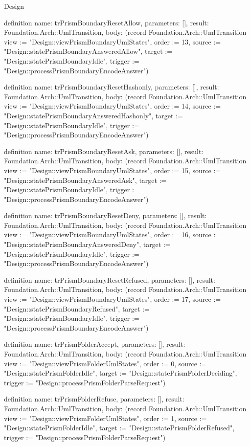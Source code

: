 \begin{lexlean}{Design}
\begin{semanticmodule}
definition{
  name: trPrismBoundaryResetAllow,
  parameters: [],
  result: Foundation.Arch::UmlTransition,
  body: (record Foundation.Arch::UmlTransition {view := "Design::viewPrismBoundaryUmlStates", order := 13, source := "Design::statePrismBoundaryAnsweredAllow", target := "Design::statePrismBoundaryIdle", trigger := "Design::processPrismBoundaryEncodeAnswer"})
}

definition{
  name: trPrismBoundaryResetHashonly,
  parameters: [],
  result: Foundation.Arch::UmlTransition,
  body: (record Foundation.Arch::UmlTransition {view := "Design::viewPrismBoundaryUmlStates", order := 14, source := "Design::statePrismBoundaryAnsweredHashonly", target := "Design::statePrismBoundaryIdle", trigger := "Design::processPrismBoundaryEncodeAnswer"})
}

definition{
  name: trPrismBoundaryResetAsk,
  parameters: [],
  result: Foundation.Arch::UmlTransition,
  body: (record Foundation.Arch::UmlTransition {view := "Design::viewPrismBoundaryUmlStates", order := 15, source := "Design::statePrismBoundaryAnsweredAsk", target := "Design::statePrismBoundaryIdle", trigger := "Design::processPrismBoundaryEncodeAnswer"})
}

definition{
  name: trPrismBoundaryResetDeny,
  parameters: [],
  result: Foundation.Arch::UmlTransition,
  body: (record Foundation.Arch::UmlTransition {view := "Design::viewPrismBoundaryUmlStates", order := 16, source := "Design::statePrismBoundaryAnsweredDeny", target := "Design::statePrismBoundaryIdle", trigger := "Design::processPrismBoundaryEncodeAnswer"})
}

definition{
  name: trPrismBoundaryResetRefused,
  parameters: [],
  result: Foundation.Arch::UmlTransition,
  body: (record Foundation.Arch::UmlTransition {view := "Design::viewPrismBoundaryUmlStates", order := 17, source := "Design::statePrismBoundaryRefused", target := "Design::statePrismBoundaryIdle", trigger := "Design::processPrismBoundaryEncodeAnswer"})
}

definition{
  name: trPrismFolderAccept,
  parameters: [],
  result: Foundation.Arch::UmlTransition,
  body: (record Foundation.Arch::UmlTransition {view := "Design::viewPrismFolderUmlStates", order := 0, source := "Design::statePrismFolderIdle", target := "Design::statePrismFolderDeciding", trigger := "Design::processPrismFolderParseRequest"})
}

definition{
  name: trPrismFolderRefuse,
  parameters: [],
  result: Foundation.Arch::UmlTransition,
  body: (record Foundation.Arch::UmlTransition {view := "Design::viewPrismFolderUmlStates", order := 1, source := "Design::statePrismFolderIdle", target := "Design::statePrismFolderRefused", trigger := "Design::processPrismFolderParseRequest"})
}


\end{semanticmodule}
\end{lexlean}

